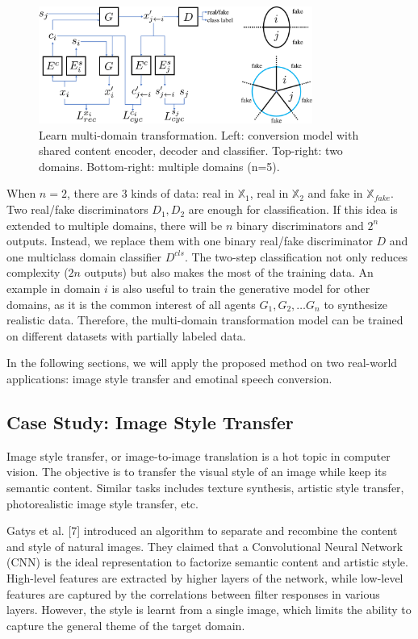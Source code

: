 \documentclass{article}
\begin{document}
\begin{figure}[htb]
\center
\includegraphics[width=0.8\textwidth]{FIG/multi}
\caption{Learn multi-domain transformation. Left: conversion model with shared content encoder, decoder and classifier. Top-right: two domains. Bottom-right: multiple domains (n=5).}
\label{fig:multi}
\end{figure}

When $n=2$, there are 3 kinds of data: real in $\mathbb{X}_1$, real in $\mathbb{X}_2$ and fake in $\mathbb{X}_{fake}$. Two real/fake discriminators $D_1,D_2$ are enough for classification.
If this idea is extended to multiple domains, there will be $n$ binary discriminators and $2^n$ outputs. Instead, we replace them with one binary real/fake discriminator $D$ and one multiclass domain classifier $D^{cls}$. The two-step classification not only reduces complexity ($2n$ outputs) but also makes the most of the training data. An example in domain $i$ is also useful to train the generative model for other domains, as it is the common interest of all agents $G_1, G_2, \ldots G_n$ to synthesize realistic data. Therefore, the multi-domain transformation model can be trained on different datasets with partially labeled data.

In the following sections, we will apply the proposed method on two real-world applications: image style transfer and emotinal speech conversion.


\subsection{Case Study: Image Style Transfer}
Image style transfer, or image-to-image translation is a hot topic in computer vision. The objective is to transfer the visual style of an image while keep its semantic content. Similar tasks includes texture synthesis, artistic style transfer, photorealistic image style transfer, etc.

Gatys et al. [7] introduced an algorithm to separate and recombine the content and style of natural images. They claimed that a Convolutional Neural Network (CNN) is the ideal representation to factorize semantic content and artistic style. High-level features are extracted by higher layers of the network, while low-level features are captured by the correlations between filter responses in various layers. However, the style is learnt from a single image, which limits the ability to capture the general theme of the target domain.
\end{document}
